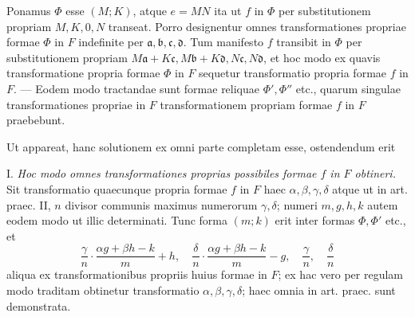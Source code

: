 Ponamus $\Phi$ esse $(M;K)$, atque $e=MN$ ita ut $f$ in $\Phi$ per substitutionem propriam $M,K,0,N$ transeat. Porro designentur omnes transformationes propriae formae $\Phi$ in $F$ indefinite per $\mathfrak{a},\mathfrak{b},\mathfrak{c},\mathfrak{d}$. Tum manifesto $f$ transibit in $\Phi$ per substitutionem propriam $M\mathfrak{a}+K\mathfrak{c},M\mathfrak{b}+K\mathfrak{d},N\mathfrak{c},N\mathfrak{d}$, et hoc modo ex quavis transformatione propria formae $\Phi$ in $F$ sequetur transformatio propria formae $f$ in $F$. --- Eodem modo tractandae sunt formae reliquae $\Phi',\Phi''$ etc., quarum singulae transformationes propriae in $F$ transformationem propriam formae $f$ in $F$ praebebunt.

Ut appareat, hanc solutionem ex omni parte completam esse, ostendendum erit

I. \textit{Hoc modo omnes transformationes proprias possibiles formae $f$ in $F$ obtineri.} Sit transformatio quaecunque propria formae $f$ in $F$ haec $\alpha,\beta,\gamma,\delta$ atque ut in art. praec. II, $n$ divisor communis maximus numerorum $\gamma,\delta$; numeri $m,g,h,k$ autem eodem modo ut illic determinati. Tunc forma $(m;k)$ erit inter formas $\Phi,\Phi'$ etc., et
\[
\frac{\gamma}{n}\cdot\frac{\alpha g+\beta h-k}{m}+h,\quad
\frac{\delta}{n}\cdot\frac{\alpha g+\beta h-k}{m}-g,\quad
\frac{\gamma}{n},\quad\frac{\delta}{n}
\]
aliqua ex transformationibus propriis huius formae in $F$; ex hac vero per regulam modo traditam obtinetur transformatio $\alpha,\beta,\gamma,\delta$; haec omnia in art. praec. sunt demonstrata.

